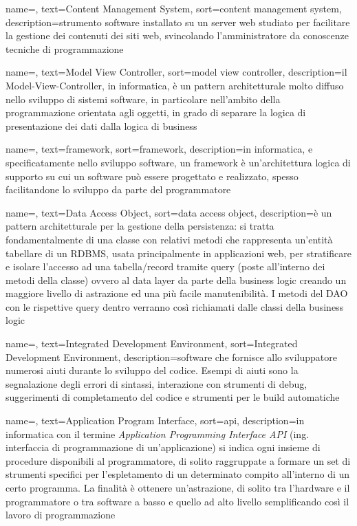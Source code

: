 {
    name=,
    text=Content Management System,
    sort=content management system,
    description={strumento software installato su un server web studiato per facilitare la
gestione dei contenuti dei siti web, svincolando l’amministratore da conoscenze
tecniche di programmazione}
}

{
    name=,
    text=Model View Controller,
    sort=model view controller,
    description={il Model-View-Controller, in informatica, è un pattern architetturale molto diffuso nello sviluppo di sistemi software, in particolare nell’ambito della programmazione orientata agli oggetti, in grado di separare la logica di presentazione dei dati dalla logica di business}
}

{
    name=,
    text=framework,
    sort=framework,
    description={in informatica, e specificatamente nello sviluppo software, un framework è un’architettura logica di supporto su cui un software può essere progettato e realizzato, spesso facilitandone lo sviluppo da parte del programmatore}
}

{
    name=,
    text=Data Access Object,
    sort=data access object,
    description={è un pattern architetturale per la gestione della persistenza: si tratta fondamentalmente di una classe con relativi metodi che rappresenta un’entità tabellare di un RDBMS, usata principalmente in applicazioni web, per stratificare e isolare l’accesso ad una tabella/record tramite query (poste all’interno dei metodi della classe) ovvero al data layer da parte della business logic creando un maggiore livello di astrazione ed una più facile manutenibilità. I metodi del DAO con le rispettive query dentro verranno così richiamati dalle classi della business logic}
}

{
    name=,
    text=Integrated Development Environment,
    sort=Integrated Development Environment,
    description={software che fornisce allo sviluppatore numerosi aiuti durante lo sviluppo del codice. Esempi di aiuti sono la segnalazione degli errori di sintassi, interazione con strumenti di debug, suggerimenti di completamento del codice e strumenti per le build automatiche}
}

{
    name=,
    text=Application Program Interface,
    sort=api,
    description={in informatica con il termine \emph{Application Programming Interface API} (ing. interfaccia di programmazione di un'applicazione) si indica ogni insieme di procedure disponibili al programmatore, di solito raggruppate a formare un set di strumenti specifici per l'espletamento di un determinato compito all'interno di un certo programma. La finalità è ottenere un'astrazione, di solito tra l'hardware e il programmatore o tra software a basso e quello ad alto livello semplificando così il lavoro di programmazione}
}

